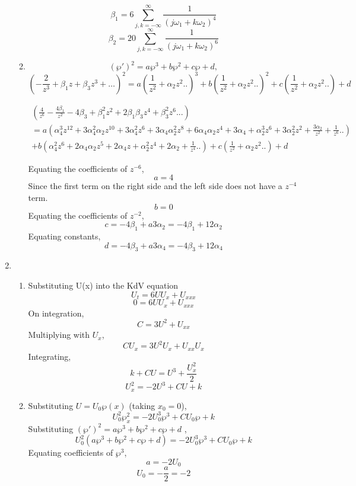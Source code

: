 \documentclass[a4paper]{article}
\begin{document}
\begin{enumerate}
\begin{enumerate}
			\[ \beta_1 = 6 \sum_{j,k=-\infty}^\infty \frac{1}{(j
				\omega_1+k \omega_2)^{4}}\]
			\[ \beta_2 = 20 \sum_{j,k=-\infty}^\infty \frac{1}{(j
				\omega_1+k \omega_2)^{6}}\]	
	
\item
\[
(\wp')^2=a \wp^3+b \wp^2+c \wp+d,
\]
\[
(-\frac{2}{z^3}+\beta_1 z+\beta_3 z^3+\ldots)^2=a (\frac{1}{z^2}  +\alpha_2 z^2 ..)^3+b (\frac{1}{z^2}  +\alpha_2 z^2 ..)^2+c(\frac{1}{z^2}  +\alpha_2 z^2 ..) +d
\]
		                         	\begin{center}             
		                         		\begin{gather*}
(\frac{4}{z^6} -\frac{4\beta_1}{z^2} -4  \beta_3+\beta_1^2z^2+2\beta_1\beta_3 z^4 +\beta_3^2 z^6 ...)\\=a (\alpha_4^3 z^{12}+3 \alpha_4^2 \alpha_2 z^{10}+3 \alpha_4^2 z^6+3 \alpha_4 \alpha_2^2 z^8+6 \alpha_4 \alpha_2z^4+3 \alpha_4+\alpha_2^3 z^6+3 \alpha_2^2 z^2+\frac{3 \alpha_2}{z^2}+\frac{1}{z^6}..)\\+b (\alpha_4^2 z^6+2 \alpha_4 \alpha_2 z^5+2 \alpha_4 z+\alpha_2^2 z^4+2 \alpha_2+\frac{1}{z^4} ..)+c(\frac{1}{z^2}  +\alpha_2 z^2 ..) +d 	\end{gather*} 
\end{center}
Equating the coefficients of $z^{-6}$,
\[a=4\]
Since the first term on the right side and the left side does not have a $z^{-4}$ term.
\[b=0\]
Equating the coefficients of $z^{-2}$,
\[c =-4\beta_1+a3\alpha_2= -4\beta_1+12\alpha_2 \]
Equating constants,
\[d= -4 \beta_3 +a3\alpha_4 = -4 \beta_3 +12\alpha_4 \]




			
\end{enumerate} 
\item 
\begin {enumerate}
\item 
Substituting U(x) into the KdV equation
\[  U_t = 6UU_x +U_{xxx} \]
\[  0 = 6UU_x +U_{xxx} \]
On integration,
\[  C = 3U^2 +U_{xx} \]
Multiplying with $U_x$,
\[  CU_x = 3U^2U_x +U_{xx}U_x \]
Integrating,
\[ k+ CU = U^3  + \frac{U_x ^2}{2} \]
\[ U_x ^2= -2 U^3 +CU +k  \]
\item 
Substituting $U = U_0 \wp(x)$ (taking $x_0=0$),
\[U_0^2\wp_x^2= -2U_0^3\wp^3 +CU_0\wp+k\]
Substituting $(\wp')^2=a \wp^3+b \wp^2+c \wp+d $ ,
\[
U_0^2(a \wp^3+b \wp^2+c \wp+d)=-2U_0^3\wp^3 +CU_0\wp+k
\]
Equating coefficients of $\wp^3$,
\[a = -2U_0\]
\[U_0= -\frac{a}{2}=-2 \]



\end{enumerate}
\end{enumerate}
\end{document}
